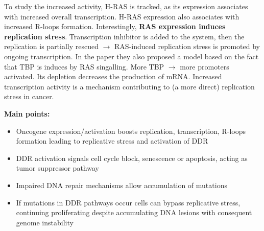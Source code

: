 To study the increased activity, H-RAS is tracked, as its expression
associates with increased overall transcription. H-RAS expression also
associates with increased R-loops formation. Interestingly, \textbf{RAS
expression induces replication stress}.
Transcription inhibitor is added to the system, then the replication is
partially rescued $\rightarrow$ RAS-induced replication stress is
promoted by ongoing transcription. In the paper they also proposed a
model based on the fact that TBP is induces by RAS singalling. More TBP
$\rightarrow$ more promoters activated. Its depletion decreases the
production of mRNA. Increased transcription activity is a mechanism
contributing to (a more direct) replication stress in cancer.


\textbf{Main points:} 
\begin{itemize}
\tightlist
\item Oncogene expression/activation boosts
replication, transcription, R-loops formation leading to replicative
stress and activation of DDR 
\item DDR activation signals cell cycle block,
senescence or apoptosis, acting as tumor suppressor pathway
\item Impaired
DNA repair mechanisms allow accumulation of mutations
\item If mutations in
DDR pathways occur cells can bypass replicative stress, continuing
proliferating despite accumulating DNA lesions with consequent genome
instability
\end{itemize}

